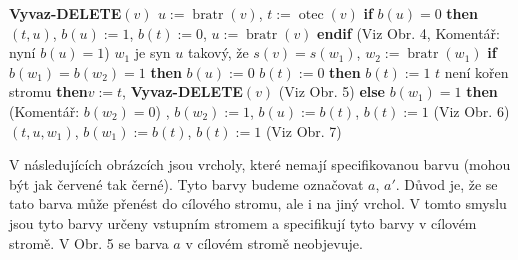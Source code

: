 \documentclass[a4paper,12pt]{article}
\DeclareMathOperator*{\otec}{otec}
\DeclareMathOperator*{\bratr}{bratr}
\begin{document}
{\bf Vyvaz-DELETE$(v)$\newline 
$u:=\bratr(v)$}, $t:=\otec(v)$\newline 
{\bf if} $b(u)=0$ {\bf then}\newline 
\phantom{---}{\bf Rotace}$(t,u)$, $b(u):=1$, $b(t):=0$, $u:=\bratr(v)$\newline 
{\bf endif\newline}
(Viz Obr. 4, Komentář: nyní $b(u)=1$)\newline 
$w_1$ je syn $u$ takový, že $s(v)=s(w_1)$, $w_2:=\bratr(w_1)$\newline 
{\bf if} $b(w_1)=b(w_2)=1$ {\bf then}\newline 
\phantom{---}$b(u):=0$\newline 
\phantom{---}{\bf if} $b(t):=0$ {\bf then}\newline 
\phantom{------}$b(t):=1$\newline 
\phantom{---}{\bf else}\newline 
\phantom{------}{\bf if} $t$ není kořen stromu {\bf then}\newline \phantom{---------}$v:=t$, {\bf Vyvaz-DELETE}$(v)$\newline 
\phantom{------}{\bf endif}\newline 
\phantom{---}{\bf endif} (Viz Obr. 5)\newline 
{\bf else}\newline 
\phantom{---}{\bf if} $b(w_1)=1$ {\bf then}\newline 
(Komentář: $b(w_2)=0$)\newline 
\phantom{------}{\bf Rotace$(t,u)$}, $b(w_2):=1$, $b(u):=b(t)$, $b(t):=1$ (Viz Obr. 6)\newline 
\phantom{---}{\bf else}\newline 
\phantom{------}{\bf Dvojita-rotace}$(t,u,w_1)$, $b(w_1):=b(t)$, $b(t):=1$ (Viz Obr. 7)\newline
\phantom{---}{\bf endif\newline 
endif}

V následujících obrázcích jsou vrcholy, které 
nemají specifikovanou barvu (mohou být jak červené tak černé).
Tyto barvy budeme označovat $a$, $a'$. Důvod je, že se 
tato barva může přenést do cílového stromu, ale 
i na jiný vrchol. V tomto smyslu jsou tyto barvy určeny vstupním 
stromem a specifikují tyto barvy v cílovém stromě. V Obr. 5 
se barva $a$ v cílovém stromě neobjevuje.

\midinsert
\centerline{}
\endcaption
\endinsert
\end{document}
